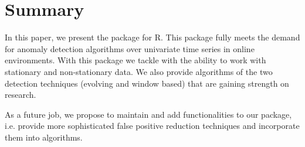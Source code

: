 \documentclass[a4paper]{article}
\begin{document}
\section{Summary}\label{sec:summary}

In this paper, we present the  package for R. This package fully meets the demand for anomaly detection algorithms over univariate time series in online environments. With this package we tackle with the ability to work with stationary and non-stationary data. We also provide algorithms of the two detection techniques (evolving and window based) that are gaining strength on research.

As a future job, we propose to maintain and add functionalities to our  package, i.e. provide more sophisticated false positive reduction techniques and incorporate them into algorithms.



\end{document}
